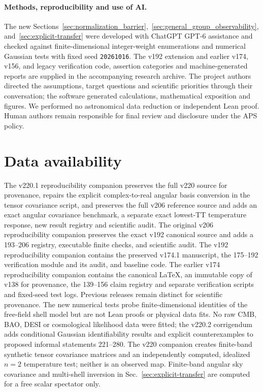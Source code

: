 \documentclass[aps,prd,onecolumn,notitlepage,groupedaddress,11pt]{revtex4-2}
\begin{document}
\paragraph{Methods, reproducibility and use of AI.} The new Sections~\ref{sec:normalization_barrier},~\ref{sec:general_group_observability}, and~\ref{sec:explicit-transfer} were developed with ChatGPT GPT-6 assistance and checked against finite-dimensional integer-weight enumerations and numerical Gaussian tests with fixed seed \texttt{20261016}. The v192 extension and earlier v174, v156, and legacy verification code, assertion categories and machine-generated reports are supplied in the accompanying research archive. The project authors directed the assumptions, target questions and scientific priorities through their conversation; the software generated calculations, mathematical exposition and figures. We performed no astronomical data reduction or independent Lean proof. Human authors remain responsible for final review and disclosure under the APS policy.\par
\section*{Data availability}
The v220.1 reproducibility companion preserves the full v220 source for provenance, repairs the explicit complex-to-real angular basis conversion in the tensor covariance script, and preserves the full v206 reference source and adds an exact angular covariance benchmark, a separate exact lowest-TT temperature response, new result registry and scientific audit. The original v206 reproducibility companion preserves the exact v192 canonical source and adds a 193--206 registry, executable finite checks, and scientific audit. The v192 reproducibility companion contains the preserved v174.1 manuscript, the 175--192 verification module and its audit, and baseline code. The earlier v174 reproducibility companion contains the canonical LaTeX, an immutable copy of v138 for provenance, the 139--156 claim registry and separate verification scripts and fixed-seed test logs. Previous releases remain distinct for scientific provenance. The new numerical tests probe finite-dimensional identities of the free-field shell model but are not Lean proofs or physical data fits. No raw CMB, BAO, DESI or cosmological likelihood data were fitted; the v220.2 corrigendum adds conditional Gaussian identifiability results and explicit counterexamples to proposed informal statements 221--280. The v220 companion creates finite-band synthetic tensor covariance matrices and an independently computed, idealized $n=2$ temperature test; neither is an observed map. Finite-band angular sky covariance and multi-shell inversion in Sec.~\ref{sec:explicit-transfer} are computed for a free scalar spectator only.
\end{document}
